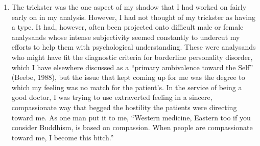 \begin{enumerate}
    \item {} The trickster was the one aspect of my shadow
        that I had worked on fairly early on in my analysis. However, I had not
        thought of my trickster as having a type. It had, however, often been
        projected onto difficult male or female analysands whose intense
        subjectivity seemed constantly to undercut my efforts to help them with
        psychological understanding. These were analysands who might have fit
        the diagnostic criteria for borderline personality disorder, which I
        have elsewhere discussed as a ``primary ambivalence toward the Self''
        (Beebe, 1988), but the issue that kept coming up for me was the degree
        to which my feeling was no match for the patient's. In the service of
        being a good doctor, I was trying to use extraverted feeling in a
        sincere, compassionate way that begged the hostility the patients were
        directing toward me. As one man put it to me, ``Western medicine,
        Eastern too if you consider Buddhism, is based on compassion. When
        people are compassionate toward me, I become this bitch.''


\end{enumerate}
